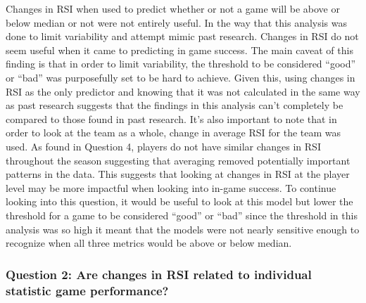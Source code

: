 \documentclass[
]{article}
\begin{document}
Changes in RSI when used to predict whether or not a game will be above
or below median or not were not entirely useful. In the way that this
analysis was done to limit variability and attempt mimic past research.
Changes in RSI do not seem useful when it came to predicting in game
success. The main caveat of this finding is that in order to limit
variability, the threshold to be considered ``good'' or ``bad'' was
purposefully set to be hard to achieve. Given this, using changes in RSI
as the only predictor and knowing that it was not calculated in the same
way as past research suggests that the findings in this analysis can't
completely be compared to those found in past research. It's also
important to note that in order to look at the team as a whole, change
in average RSI for the team was used. As found in Question 4, players do
not have similar changes in RSI throughout the season suggesting that
averaging removed potentially important patterns in the data. This
suggests that looking at changes in RSI at the player level may be more
impactful when looking into in-game success. To continue looking into
this question, it would be useful to look at this model but lower the
threshold for a game to be considered ``good'' or ``bad'' since the
threshold in this analysis was so high it meant that the models were not
nearly sensitive enough to recognize when all three metrics would be
above or below median.

\subsubsection{Question 2: Are changes in RSI related to individual
statistic game
performance?}\label{question-2-are-changes-in-rsi-related-to-individual-statistic-game-performance-1}
\end{document}
